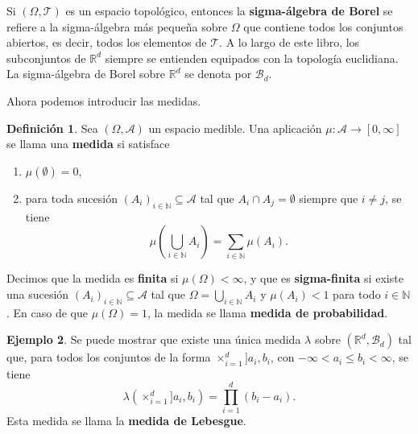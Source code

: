 \documentclass[11pt]{report}
\newenvironment{tcolorbox}[1][]{\par\medskip\noindent\ignorespaces}{\par\medskip}
\theoremstyle{definition}
\newtheorem{definicion}{Definición}[section]
\newtheorem{ejemplo}[definicion]{Ejemplo}
\theoremstyle{plain}
\numberwithin{equation}{section}
\begin{document}
Si \((\Omega,\mathcal{T})\) es un espacio topológico, entonces la \textbf{sigma-álgebra de Borel} se refiere a la sigma-álgebra más pequeña sobre \(\Omega\) que contiene todos los conjuntos abiertos, es decir, todos los elementos de \(\mathcal{T}\). A lo largo de este libro, los subconjuntos de \(\mathbb{R}^d\) siempre se entienden equipados con la topología euclidiana. La sigma-álgebra de Borel sobre \(\mathbb{R}^d\) se denota por \(\mathcal{B}_d\).

Ahora podemos introducir las medidas.

\begin{tcolorbox}[colback=blue!8, colframe=blue!8, boxrule=0pt]
\begin{definicion}
Sea \((\Omega,\mathcal{A})\) un espacio medible. Una aplicación \(\mu:\mathcal{A}\to[0,\infty]\) se llama una \textbf{medida} si satisface

\begin{enumerate}
    \item[(i)] \(\mu(\emptyset)=0\),
    \item[(ii)] para toda sucesión \((A_i)_{i\in\mathbb{N}}\subseteq\mathcal{A}\) tal que \(A_i\cap A_j=\emptyset\) siempre que \(i\neq j\), se tiene
    \begin{equation*}
        \mu\left(\bigcup_{i\in\mathbb{N}} A_i\right)
        =
        \sum_{i\in\mathbb{N}}\mu(A_i).
    \end{equation*}
\end{enumerate}

Decimos que la medida es \textbf{finita} si \(\mu(\Omega)<\infty\), y que es \textbf{sigma-finita} si existe una sucesión \((A_i)_{i\in\mathbb{N}}\subseteq\mathcal{A}\) tal que \(\Omega=\bigcup_{i\in\mathbb{N}}A_i\) y \(\mu(A_i)<1\) para todo \(i\in\mathbb{N}\). En caso de que \(\mu(\Omega)=1\), la medida se llama \textbf{medida de probabilidad}.
\end{definicion}
\end{tcolorbox}

\begin{ejemplo}
Se puede mostrar que existe una única medida \(\lambda\) sobre \((\mathbb{R}^d,\mathcal{B}_d)\) tal que, para todos los conjuntos de la forma \(\times_{i=1}^{d}]a_i,b_i\), con \(-\infty<a_i\leq b_i<\infty\), se tiene
\begin{equation*}
    \lambda\left(\times_{i=1}^{d}]a_i,b_i\right)
    =
    \prod_{i=1}^{d}(b_i-a_i).
\end{equation*}
Esta medida se llama la \textbf{medida de Lebesgue}.
\end{ejemplo}
\end{document}
